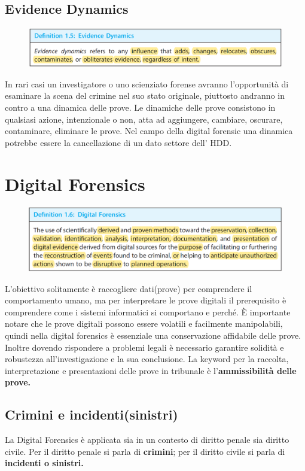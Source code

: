 \subsection{Evidence Dynamics}
\begin{figure}[h!]
    \includegraphics[width=\textwidth]{Capitolo 1/Figure/evidence-dynamic.png}
\end{figure}
In rari casi un investigatore o uno scienziato forense avranno l'opportunità di esaminare la scena del crimine nel suo stato originale, piuttosto andranno in contro a una dinamica delle prove.
Le dinamiche delle prove consistono in qualsiasi azione, intenzionale o non, atta ad aggiungere, cambiare, oscurare, contaminare, eliminare le prove.
Nel campo della digital forensic una dinamica potrebbe essere la cancellazione di un dato settore dell' HDD.

\clearpage
\section{Digital Forensics}
\begin{figure}[h!]
    \includegraphics[width=\textwidth]{Capitolo 1/Figure/digital-forensics-def.png}
\end{figure}
L'obiettivo solitamente è raccogliere dati(prove) per comprendere il comportamento umano, ma per interpretare le prove digitali il prerequisito è comprendere come i sistemi informatici si comportano e perché. 
È importante notare che le prove digitali possono essere volatili e facilmente manipolabili, quindi nella digital forensics è essenziale una conservazione affidabile delle prove.
Inoltre dovendo rispondere a problemi legali è necessario garantire solidità e robustezza all'investigazione e la sua conclusione.
La keyword per la raccolta, interpretazione e presentazioni delle prove in tribunale è l'\textbf{ammissibilità delle prove.}

\subsection{Crimini e incidenti(sinistri)}
La Digital Forensics è applicata sia in un contesto di diritto penale sia diritto civile. Per il diritto penale si parla di \textbf{crimini}; per il diritto civile si parla di \textbf{incidenti o sinistri.}


